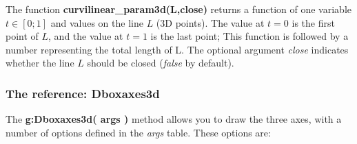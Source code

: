 The function \textbf{curvilinear\_param3d(L,close)} returns a function of one variable $t\in[0;1]$ and values ​​on the line $L$ (3D points). The value at $t=0$ is the first point of $L$, and the value at $t=1$ is the last point; This function is followed by a number representing the total length of L. The optional argument \emph{close} indicates whether the line $L$ should be closed (\emph{false} by default).

\subsubsection{The reference: Dboxaxes3d}

The \textbf{g:Dboxaxes3d( args )} method allows you to draw the three axes, with a number of options defined in the \emph{args} table. These options are:
\def\opt#1{\textcolor{blue}{\texttt{#1}}}%
